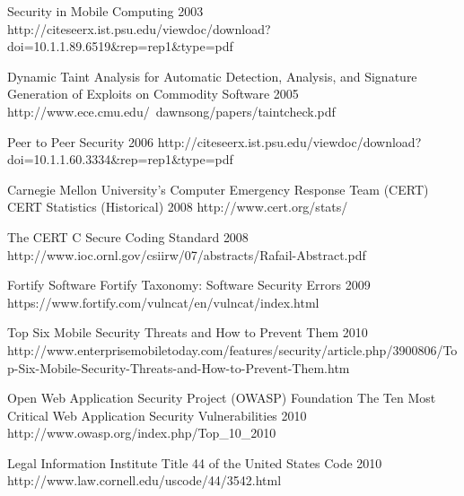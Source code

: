 \begin{thebibliography}{9}
		{
			\BibAnd
			\BibAnd
			\BibAnd
			}
		{Security in Mobile Computing}	
		{2003}	
		{http://citeseerx.ist.psu.edu/viewdoc/download?doi=10.1.1.89.6519\&rep=rep1\&type=pdf}

		{
			\BibAnd
			}
		{Dynamic Taint Analysis for Automatic Detection, Analysis, and Signature Generation of Exploits on Commodity Software}	
		{2005}	
		{http://www.ece.cmu.edu/~dawnsong/papers/taintcheck.pdf}
	
		{}
		{Peer to Peer Security}	
		{2006}
		{http://citeseerx.ist.psu.edu/viewdoc/download?doi=10.1.1.60.3334\&rep=rep1\&type=pdf}


		{Carnegie Mellon University's Computer Emergency Response Team (CERT)}
		{CERT Statistics (Historical)}
		{2008}
		{http://www.cert.org/stats/}
				
		{
			\BibAnd
			}
		{The {CERT} {C} Secure Coding Standard}
		{2008}
		{http://www.ioc.ornl.gov/csiirw/07/abstracts/Rafail-Abstract.pdf}

		{Fortify Software}
		{Fortify Taxonomy: Software Security Errors}
		{2009}
		{https://www.fortify.com/vulncat/en/vulncat/index.html}
		
		{}
		{Top Six Mobile Security Threats and How to Prevent Them}
		{2010}
		{http://www.enterprisemobiletoday.com/features/security/article.php/3900806/Top-Six-Mobile-Security-Threats-and-How-to-Prevent-Them.htm}
		
		{Open Web Application Security Project (OWASP) Foundation}
		{The Ten Most Critical Web Application Security Vulnerabilities}
		{2010}
		{http://www.owasp.org/index.php/Top_10_2010}

		{Legal Information Institute}
		{Title 44 of the United States Code}
		{2010}
		{http://www.law.cornell.edu/uscode/44/3542.html}
	

\end{thebibliography}
